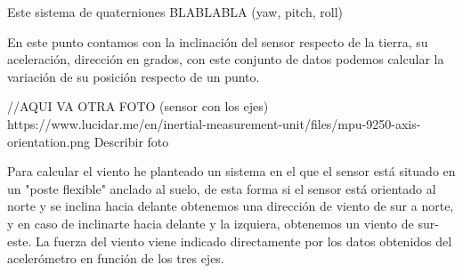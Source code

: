  
   
 Este sistema de quaterniones BLABLABLA (yaw, pitch, roll)
  

 
 En este punto contamos con la inclinación del sensor respecto de la tierra, su aceleración, dirección en grados, con este conjunto de datos podemos calcular la variación de su posición respecto de un punto.
 
  //AQUI VA OTRA FOTO (sensor con los ejes)
  https://www.lucidar.me/en/inertial-measurement-unit/files/mpu-9250-axis-orientation.png
  Describir foto
  
  Para calcular el viento he planteado un sistema en el que el sensor está situado en un "poste flexible" anclado al suelo, de esta forma si el sensor está orientado al norte y se inclina hacia delante obtenemos una dirección de viento de sur a norte, y en caso de inclinarte hacia delante y la izquiera, obtenemos un viento de sur-este. La fuerza del viento viene indicado directamente por los datos obtenidos del acelerómetro en función de los tres ejes.
  
  